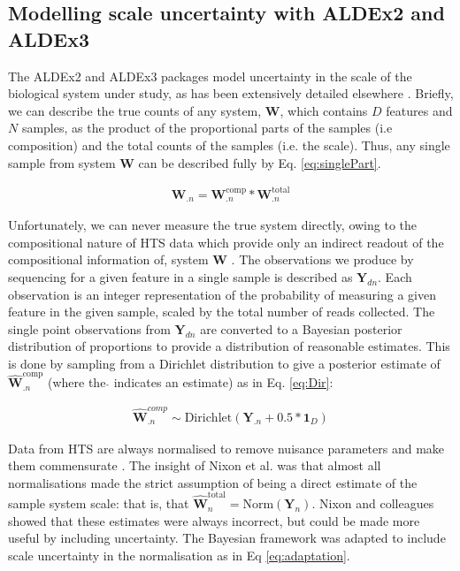 \documentclass{article}
\begin{document}
\subsection{Modelling scale uncertainty with ALDEx2 and ALDEx3}
The ALDEx2 and ALDEx3 packages model uncertainty in the scale of the biological system under study, as has been extensively detailed elsewhere \cite{nixon_incorporating_2025, gloor_explicit_2025}. Briefly, we can describe the true counts of any system, $\mathbf{W}$, which contains $D$ features and $N$ samples, as the product of the proportional parts of the samples (i.e  composition) and the total counts of the samples (i.e. the  scale). Thus, any single sample from  system $\mathbf{W}$ can be described fully by Eq. \ref{eq:singlePart}.

\begin{eqnarray}
	\label{eq:singlePart}
	\mathbf{W}_{.n} = \mathbf{W}^{\mathrm{comp}}_{.n} * \mathbf{W}^{\mathrm{total}}_{.n} 
\end{eqnarray}

Unfortunately, we can never measure the true system directly, owing to the compositional nature of HTS data which provide only an indirect readout of the compositional information of, system $\mathbf{W}$ \cite{lovell_proportions_2011, gloor_microbiome_2017}. The observations we produce by sequencing for a given feature in a single sample is described as $\mathbf{Y}_{dn}$. Each observation is an integer representation of the probability of measuring a given feature in the given sample, scaled by the total number of reads collected\cite{fernandes:2013}. The single  point observations from $\mathbf{Y}_{dn}$ are converted to a Bayesian posterior distribution of proportions \cite{fernandes:2013} to provide a distribution of reasonable estimates. This is done by sampling from a Dirichlet distribution to give a posterior estimate of $\hat{\mathbf{W}}^{\mathrm{comp}}_{.n}$ \cite{fernandes:2014} (where the $\hat{}$ indicates an estimate) as in Eq. \ref{eq:Dir}:

\begin{eqnarray}
	\label{eq:Dir}
	\hat{\mathbf{W}}^{comp}_{.n} \sim \mathrm{Dirichlet}(\mathbf{Y}_{.n} + 0.5 * \mathbf{1}_{D})
\end{eqnarray}

Data from HTS are always normalised to remove nuisance parameters and make them commensurate \cite{robinson_scaling_2010}. The insight of Nixon et al. \cite{nixon_scale_2024} was that almost all normalisations made the strict assumption of being a direct estimate of the sample system scale: that is, that $\hat{\mathbf{W}}^{\mathrm{total}}_{n} = \mathrm{Norm}(\mathbf{Y}_{n})$. Nixon and colleagues showed that these estimates were always incorrect, but could be made more useful by including  uncertainty. The Bayesian framework was adapted to include scale uncertainty in the normalisation as in Eq \ref{eq:adaptation}.
\end{document}
